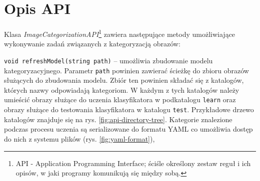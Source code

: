 \section{Opis API}

Klasa \emph{ImageCategorizationAPI}\footnote{API - Application Programming Interface; ściśle określony zestaw reguł i ich opisów, w jaki programy komunikują się między sobą.} zawiera następujące metody umożliwiające wykonywanie zadań związanych z kategoryzacją obrazów:

\begin{compactitem}
	\item \texttt{void refreshModel(string path)} -- umożliwia zbudowanie modelu kategoryzacyjnego. Parametr \texttt{path} powinien zawierać ścieżkę do zbioru obrazów służących do zbudowania modelu. Zbiór ten powinien składać się z katalogów, których nazwy odpowiadają kategoriom. W każdym z tych katalogów należy umieścić obrazy służące do uczenia klasyfikatora w podkatalogu \texttt{learn} oraz obrazy służące do testowania klasyfikatora w katalogu \texttt{test}. Przykładowe drzewo katalogów znajduje się na rys. \ref{fig:api-directory-tree}. Kategorie znalezione podczas procesu uczenia są serializowane do formatu YAML co umożliwia dostęp do nich z systemu plików (rys. \ref{fig:yaml-format}),
	

\end{compactitem}
